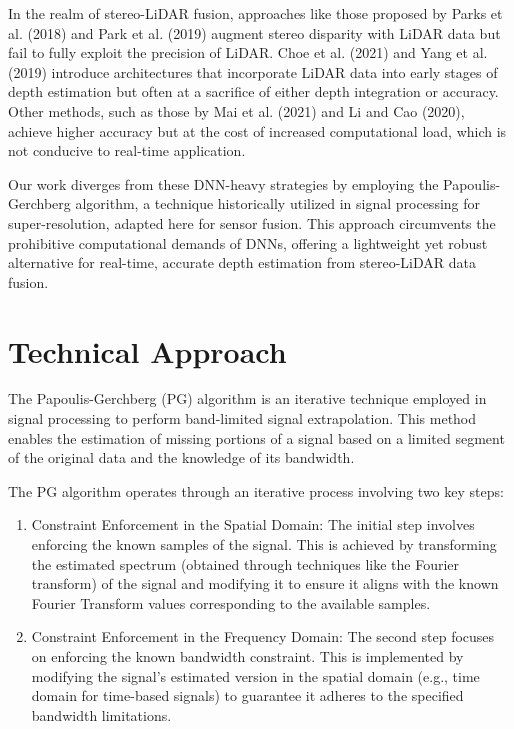 \documentclass[conference]{IEEEtran}
\begin{document}
In the realm of stereo-LiDAR fusion, approaches like those proposed by Parks et al. (2018) and Park et al. (2019) augment stereo disparity with LiDAR data but fail to fully exploit the precision of LiDAR. Choe et al. (2021) and Yang et al. (2019) introduce architectures that incorporate LiDAR data into early stages of depth estimation but often at a sacrifice of either depth integration or accuracy. Other methods, such as those by Mai et al. (2021) and Li and Cao (2020), achieve higher accuracy but at the cost of increased computational load, which is not conducive to real-time application.

Our work diverges from these DNN-heavy strategies by employing the Papoulis-Gerchberg algorithm, a technique historically utilized in signal processing for super-resolution, adapted here for sensor fusion. This approach circumvents the prohibitive computational demands of DNNs, offering a lightweight yet robust alternative for real-time, accurate depth estimation from stereo-LiDAR data fusion.

\section{Technical Approach}

The Papoulis-Gerchberg (PG) algorithm is an iterative technique employed in signal processing to perform band-limited signal extrapolation. This method enables the estimation of missing portions of a signal based on a limited segment of the original data and the knowledge of its bandwidth.

The PG algorithm operates through an iterative process involving two key steps:

\begin{enumerate}
    \item Constraint Enforcement in the Spatial Domain:
    The initial step involves enforcing the known samples of the signal. This is achieved by transforming the estimated spectrum (obtained through techniques like the Fourier transform) of the signal and modifying it to ensure it aligns with the known Fourier Transform values corresponding to the available samples.
    
    \item Constraint Enforcement in the Frequency Domain:
    The second step focuses on enforcing the known bandwidth constraint. This is implemented by modifying the signal's estimated version in the spatial domain (e.g., time domain for time-based signals) to guarantee it adheres to the specified bandwidth limitations.
\end{enumerate}
\end{document}
